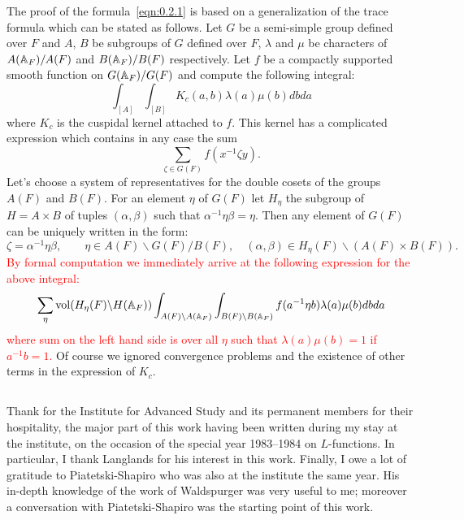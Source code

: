 The proof of the formula~\eqref{eqn:0.2.1} is based on a generalization of the trace formula which can be stated as follows.
Let $G$ be a semi-simple group defined over $F$ and $A$, $B$ be subgroups of $G$ defined over $F$, $\lambda$ and $\mu$ be characters of $A (\mathbb{A}_F) / A(F)$ and $B(\mathbb{A}_F) / B(F)$ respectively.
Let $f$ be a compactly supported smooth function on $G(\mathbb{A}_F) / G(F)$ and compute the following integral:
\[
\int_{[A]} \int_{[B]} K_c(a, b) \lambda(a) \mu(b) db da
\]
where $K_c$ is the cuspidal kernel attached to $f$.
This kernel has a complicated expression which contains in any case the sum
\[
\sum_{\zeta \in G(F)} f(x^{-1} \zeta y).
\]
Let's choose a system of representatives for the double cosets of the groups $A(F)$ and $B(F)$.
For an element $\eta$  of $G(F)$ let $H_\eta$ the subgroup of $H = A\times B$ of tuples $(\alpha, \beta)$ such that $\alpha^{-1} \eta \beta = \eta$.
Then any element of $G(F)$ can be uniquely written in the form:
\[
\zeta = \alpha^{-1} \eta \beta, \qquad \eta \in A(F) \backslash G(F) / B(F), \quad (\alpha, \beta) \in H_{\eta}(F) \backslash (A(F) \times B(F)).
\]
\textcolor{red}{
By formal computation we immediately arrive at the following expression for the above integral:
\[
\sum_{\eta} \mathrm{vol}(H_{\eta}(F) \backslash H(\mathbb{A}_F)) \int_{A(F) \backslash A(\mathbb{A}_F)} \int_{B(F) \backslash B(\mathbb{A}_F)} f(a^{-1} \eta b) \lambda(a) \mu(b) db da
\]
where sum on the left hand side is over all $\eta$ such that $\lambda(a) \mu(b) = 1$ if $a^{-1} b = 1$.
}
Of course we ignored convergence problems and the existence of other terms in the expression of $K_c$.

\subsection{}
Thank for the Institute for Advanced Study and its permanent members for their hospitality, the major part of this work having been written during my stay at the institute, on the occasion of the special year 1983--1984 on $L$-functions.
In particular, I thank Langlands for his interest in this work.
Finally, I owe a lot of gratitude to Piatetski-Shapiro who was also at the institute the same year.
His in-depth knowledge of the work of Waldspurger was very useful to me; moreover a conversation with Piatetski-Shapiro was the starting point of this work.